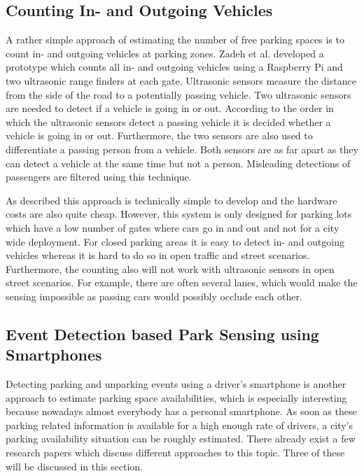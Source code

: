 \subsection{Counting In- and Outgoing Vehicles}
\label{sec:counting_in_out_park_sensing}

A rather simple approach of estimating the number of free parking spaces is to count in- and outgoing vehicles at parking zones. Zadeh et al. \cite{smarturbanparkingdetection} developed a prototype which counts all in- and outgoing vehicles using a Raspberry Pi and two ultrasonic range finders at each gate. Ultrasonic sensors measure the distance from the side of the road to a potentially passing vehicle. Two ultrasonic sensors are needed to detect if a vehicle is going in or out. According to the order in which the ultrasonic sensors detect a passing vehicle it is decided whether a vehicle is going in or out. Furthermore, the two sensors are also used to differentiate a passing person from a vehicle. Both sensors are as far apart as they can detect a vehicle at the same time but not a person. Misleading detections of passengers are filtered using this technique.

As described this approach is technically simple to develop and the hardware costs are also quite cheap. However, this system is only designed for parking lots which have a low number of gates where cars go in and out and not for a city wide deployment. For closed parking areas it is easy to detect in- and outgoing vehicles whereas it is hard to do so in open traffic and street scenarios. Furthermore, the counting also will not work with ultrasonic sensors in open street scenarios. For example, there are often several lanes, which would make the sensing impossible as passing cars would possibly occlude each other.






\subsection{Event Detection based Park Sensing using Smartphones}
\label{sec:event_detection_park_sensing}

Detecting parking and unparking events using a driver's smartphone is another approach to estimate parking space availabilities, which is especially interesting because nowadays almost everybody has a personal smartphone. As soon as these parking related information is available for a high enough rate of drivers, a city's parking availability situation can be roughly estimated. There already exist a few research papers which discuss different approaches to this topic. Three of these will be discussed in this section.

